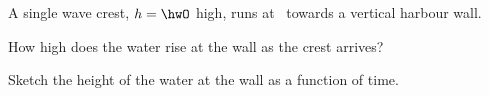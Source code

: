 A single wave crest, $h = \hwO$ high, runs at \vO\ towards a vertical harbour wall.

\begin{abcliste}
\abc How high does the water rise at the wall as the crest arrives?

\abc Sketch the height of the water at the wall as a function of time.
\end{abcliste}
